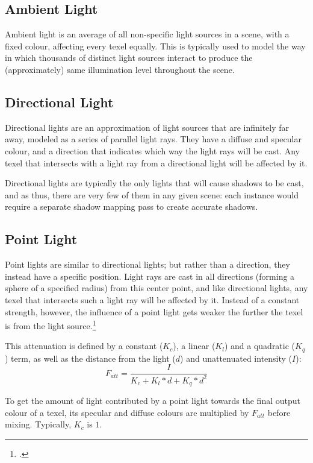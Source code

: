 \documentclass[11pt, oneside]{report}
\begin{document}
\subsection{Ambient Light}
Ambient light is an average of all non-specific light sources in a scene, with a fixed colour, affecting every \gls{texel} equally. This is typically used to model the way in which thousands of distinct light sources interact to produce the (approximately) same illumination level throughout the scene.

\subsection{Directional Light}
Directional lights are an approximation of light sources that are infinitely far away, modeled as a series of parallel light rays. They have a diffuse and specular colour, and a direction that indicates which way the light rays will be cast. Any \gls{texel} that intersects with a light ray from a directional light will be affected by it.

Directional lights are typically the only lights that will cause shadows to be cast, and as thus, there are very few of them in any given scene: each instance would require a separate \gls{shadow mapping} pass to create accurate shadows.

\subsection{Point Light}
Point lights are similar to directional lights; but rather than a direction, they instead have a specific position. Light rays are cast in all directions (forming a sphere of a specified radius) from this center point, and like directional lights, any \gls{texel} that intersects such a light ray will be affected by it. Instead of a constant strength, however, the influence of a point light gets weaker the further the \gls{texel} is from the light source.\footcite{pointlight-attenuate}	

This attenuation is defined by a constant ($K_c$), a linear ($K_l$) and a quadratic ($K_q$) term, as well as the distance from the light ($d$) and unattenuated intensity ($I$): \begin{equation} F_{att} = \frac{I}{K_c + K_l * d + K_q * d^2} \end{equation}

To get the amount of light contributed by a point light towards the final output colour of a \gls{texel}, its specular and diffuse colours are multiplied by $F_{att}$ before mixing. Typically, $K_c$ is $1$.
\end{document}

